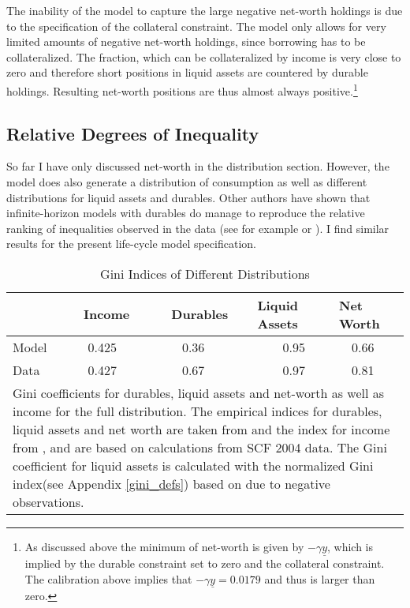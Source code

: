 \documentclass[a4paper,12pt,legno]{article}
\begin{document}
The inability of the model to capture the large negative net-worth holdings is due to the specification of the collateral constraint. The model only allows for very limited amounts of negative net-worth holdings, since borrowing has to be collateralized. The fraction, which can be collateralized by income is very close to zero and therefore short positions in liquid assets are countered by durable holdings. Resulting net-worth positions are thus almost always positive.\footnote{As discussed above the minimum of net-worth is given by $-\gamma\underline{y}$, which is implied by the durable constraint set to zero and the collateral constraint. The calibration above implies that $-\gamma\underline{y} = 0.0179$ and thus is larger than zero.} 

\subsection{Relative Degrees of Inequality}
So far I have only discussed net-worth in the distribution section. However, the model does also generate a distribution of consumption as well as different distributions for liquid assets and durables. Other authors have shown that infinite-horizon models with durables do manage to reproduce the relative ranking of inequalities observed in the data (see for example \cite{hintermaier2010} or \cite{diaz2010}). I find similar results for the present life-cycle model specification.


\begin{table}[!htbp]
\centering
\caption{Gini Indices of Different Distributions}
\label{Gini_Ranking}
\begin{tabular}{@{}lllll@{}}
\toprule
       & \ \ Income & \ \ Durables & Liquid Assets & Net Worth \\ \midrule
Model      &  \ \ \ 0.425 & \ \ \ \ 0.36   & \ \ \ \ 0.95        & \ \ 0.66    \\ \midrule
Data        & \ \ \ 0.427  & \ \ \ \ 0.67     & \ \ \ \ 0.97          & \ \ 0.81      \\ \bottomrule
\multicolumn{5}{l}{%
  \begin{minipage}{10.5cm}%
    \small Gini coefficients for durables, liquid assets and net-worth as well as income for the full distribution. The empirical indices for durables, liquid assets and net worth are taken from \cite{hintermaier2010} and the index for income from \cite{hintermaier2011}, and are based on calculations from SCF 2004 data. The Gini coefficient for liquid assets is calculated with the normalized Gini index(see Appendix \ref{gini_defs}) based on \cite{chen1982} due to negative observations. 
  \end{minipage}%
}\\
\end{tabular}
\end{table}
\end{document}
